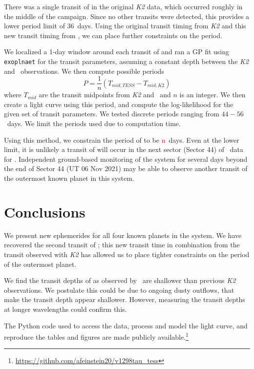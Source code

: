 \documentclass[twocolumn]{aastex631}
\begin{document}
There was a single transit of \planete in the original \textit{K2} data, which occurred roughly in the middle of the campaign. Since no other transits were detected, this provides a lower period limit of 36~days. Using the original transit timing from \textit{K2} and this new transit timing from \tess, we can place further constraints on the period. 

We localized a 1-day window around each transit of \planete and ran a GP fit using \texttt{exoplnaet} for the transit parameters, assuming a constant depth between the \textit{K2} and \tess\ observations. We then compute possible periods 
\begin{equation}
    P = \frac{1}{n} \left(T_{mid,TESS} - T_{mid, K2}\right)
\end{equation}
where $T_{mid}$ are the transit midpoints from \textit{K2} and \tess\ and $n$ is an integer. We then create a light curve using this period, and compute the log-likelihood for the given set of transit parameters. We tested discrete periods ranging from $44- 56$~days. We limit the periods used due to computation time.

Using this method, we constrain the period of \planete to be \textcolor{red}{n}~days. Even at the lower limit, it is unlikely a transit of \planete will occur in the next sector (Sector 44) of \tess\ data for \sname. Independent ground-based monitoring of the system for several days beyond the end of Sector 44 (UT 06 Nov 2021) may be able to observe another transit of the outermost known planet in this system.



\section{Conclusions} \label{sec:conclusions}

We present new ephemerides for all four known planets in the \sname system. We have recovered the second transit of \planete; this new transit time in combination from the transit observed with \textit{K2} has allowed us to place tighter constraints on the period of the outermost planet.

We find the transit depths of \allplanets as observed by \tess\ are shallower than previous \textit{K2} observations. We postulate this could be due to ongoing dusty outflows, that make the transit depth appear shallower. However, measuring the transit depths at longer wavelengths could confirm this.


The Python code used to access the data, process and model the light curve, and reproduce the tables and figures are made publicly available.\footnote{\url{https://github.com/afeinstein20/v1298tau_tess}}
\end{document}
